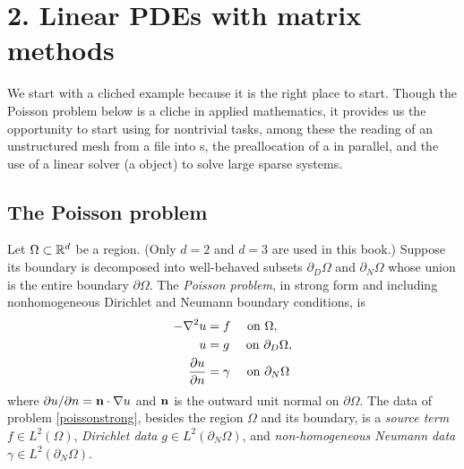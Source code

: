
\chapter{2. Linear PDEs with matrix methods}

We start with a cliched example because it is the right place to start.  Though the Poisson problem below is a cliche in applied mathematics, it provides us the opportunity to start using \PETSc for nontrivial tasks, among these the reading of an unstructured mesh from a file into \PETSc \pVec s, the preallocation of a \pMat in parallel, and the use of a linear solver (a \pKSP object) to solve large sparse systems.

\section{The Poisson problem}

Let $\Omega \subset \mathbb{R}^d$ be a region.  (Only $d=2$ and $d=3$ are used in this book.)  Suppose its boundary is decomposed into well-behaved subsets $\partial_D \Omega$ and $\partial_N \Omega$ whose union is the entire boundary $\partial \Omega$.  The \emph{Poisson problem}, in strong form and including nonhomogeneous Dirichlet and Neumann boundary conditions, is
\begin{align}
- \nabla^2 u &= f \quad \text{ on } \Omega, \label{poissonstrong} \\
u &= g \quad \text{ on } \partial_D \Omega, \notag \\
\frac{\partial u}{\partial n} &= \gamma \quad \text{ on } \partial_N \Omega \notag
\end{align}
where $\partial u/\partial n = \mathbf{n} \cdot \nabla u$ and $\mathbf{n}$ is the outward unit normal on $\partial \Omega$.  The data of problem \eqref{poissonstrong}, besides the region $\Omega$ and its boundary, is a \emph{source term} $f\in L^2(\Omega)$, \emph{Dirichlet data} $g\in L^2(\partial_N \Omega)$, and \emph{non-homogeneous Neumann data} $\gamma\in L^2(\partial_N \Omega)$.

